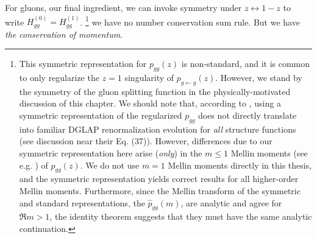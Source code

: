 For gluons, our final ingredient, we can invoke symmetry under \(z \leftrightarrow 1-z\) to write \(H^{(0)}_{gg} = H^{(1)}_{gg}\).%
\footnote{
    This symmetric representation for \(p_{gg}(z)\) is non-standard, and it is common to only regularize the \(z=1\) singularity of \(p_{g\leftarrow g}(z)\).
    However, we stand by the symmetry of the gluon splitting function in the physically-motivated discussion of this chapter.
    We should note that, according to , using a symmetric representation of the regularized \(p_{gg}\) does not directly translate into familiar DGLAP renormalization evolution for \emph{all} structure functions (see discussion near their Eq. (37)).
    However, differences due to our symmetric representation here arise (\emph{only}) in the \(m\leq1\) Mellin moments (see e.g. ) of \(p_{gg}(z)\).
    We do not use \(m=1\) Mellin moments directly in this thesis, and the symmetric representation yields correct results for all higher-order Mellin moments.
    Furthermore, since the Mellin transform of the symmetric and standard representations, the \(\hat{p}_{gg}(m)\), are analytic and agree for \(\Re m > 1\), the identity theorem suggests that they must have the same analytic continuation.
}
%
we have no number conservation sum rule.
%
But we have \emph{the conservation of momentum}.

